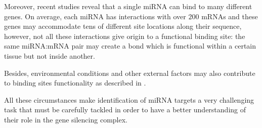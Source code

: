 Moreover, recent studies \cite{common_features} \cite{computational_methods} reveal that a single miRNA can bind to many different genes. On average, each miRNA has interactions with over $200$ mRNAs and these genes may accommodate tens of  different site locations along their sequence, however, not all these interactions give origin to a functional binding site: the same miRNA:mRNA pair may create a bond which is functional within a certain tissue but not inside another. 

Besides, environmental conditions and other external factors  may also contribute to binding sites functionality as described in \cite{efficient_use_accessibility}.

All these circumstances make identification of miRNA targets a very challenging task that must be carefully tackled in order to have a better understanding of their role in the gene silencing complex. 
